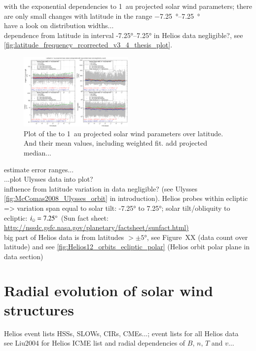 with the exponential dependencies to 1~au projected solar wind parameters; there are only small changes with latitude in the range \SIrange{-7.25}{7.25}{\degree}\\
have a look on distribution widths...\\

dependence from latitude in interval -7.25°--7.25° in Helios data negligible?, see \autoref{fig:latitude_frequency_rcorrected_v3_4_thesis_plot}.
\begin{figure}[htb]
	\centering
	\includegraphics[width=0.5\textwidth]{images/gnuplots/latitude_frequency_rcorrected_v3_4_thesis_plot.png}
	\caption{Plot of the to 1~au projected solar wind parameters over latitude. And their mean values, including weighted fit. add projected median...}
	\label{fig:latitude_frequency_rcorrected_v3_4_thesis_plot}
\end{figure}
estimate error ranges...\\

...plot Ulysses data into plot?\\

influence from latitude variation in data negligible? (see Ulysses \autoref{fig:McComas2008_Ulysses_orbit} in introduction). Helios probes within ecliptic => variation span equal to solar tilt: -7.25° to 7.25°; solar tilt/obliquity to ecliptic: $i_\odot = 7.25\degree$ (Sun fact sheet: \url{http://nssdc.gsfc.nasa.gov/planetary/factsheet/sunfact.html)}\\
big part of Helios data is from latitudes $>\pm5$°, see Figure~XX (data count over latitude) and see \autoref{fig:Helios12_orbits_ecliptic_polar} (Helios orbit polar plane in data section)\\


\section{Radial evolution of solar wind structures}

Helios event lists HSSs, SLOWs, CIRs, CMEs...; event lists for all Helios data\\
see Liu2004 for Helios ICME list and radial dependencies of $B$, $n$, $T$ and $v$...\\

